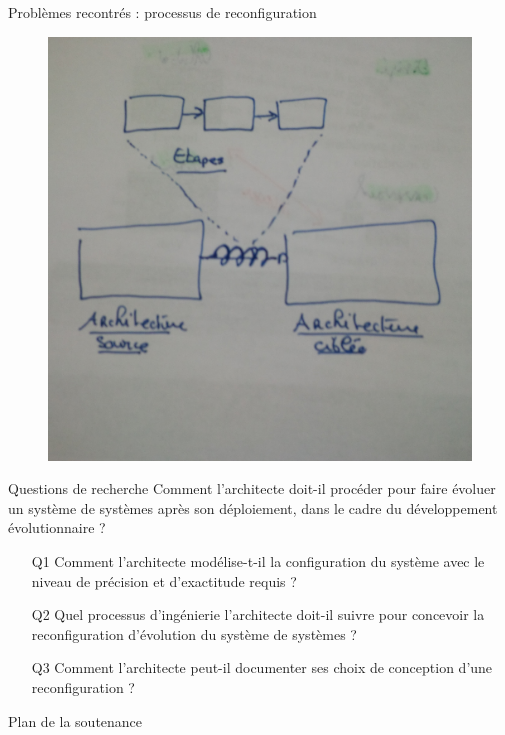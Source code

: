 \begin{frame}{Problèmes recontrés : processus de reconfiguration}
\begin{figure}
\centering
\includegraphics[width=\textwidth, height=0.6\textwidth]{imgs/slide_introduction_process.jpg}
\end{figure}
\end{frame}

\begin{frame}{Questions de recherche}
Comment l’architecte doit-il procéder pour faire évoluer un système de systèmes après son déploiement, dans le cadre du développement évolutionnaire ?\\
\begin{itemize}
    \item[Q1] Comment l’architecte modélise-t-il la configuration du système avec le niveau de précision et d’exactitude requis ?
    \item[Q2] Quel processus d’ingénierie l’architecte doit-il suivre pour concevoir la reconfiguration d’évolution du système de systèmes ?
    \item[Q3] Comment l’architecte peut-il documenter ses choix de conception d’une reconfiguration ?
\end{itemize}
\end{frame}

\begin{frame}{Plan de la soutenance}
\tableofcontents
\end{frame}


